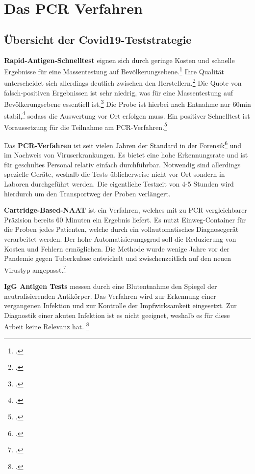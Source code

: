 \chapter{Das PCR Verfahren}
\section{Übersicht der Covid19-Teststrategie}
\textbf{Rapid-Antigen-Schnelltest} eignen sich durch geringe Kosten und schnelle Ergebnisse für eine Massentestung auf Bevölkerungsebene.\footcite{papenburg_adequacy_2022}
Ihre Qualität unterscheidet sich allerdings deutlich zwischen den Herstellern.\footcite{zerforschung_zerforschung_2022}
Die Quote von falsch-positiven Ergebnissen ist sehr niedrig, was für eine Massentestung auf Bevölkerungsebene essentiell ist.\footcite{papenburg_adequacy_2022}
Die Probe ist hierbei nach Entnahme nur 60min stabil,\footcite{weishampel_orasure_2022}
sodass die Auswertung vor Ort erfolgen muss.
Ein positiver Schnelltest ist Voraussetzung für die Teilnahme am PCR-Verfahren.\footcite{land_corona-verordnung_2022}

Das \textbf{PCR-Verfahren} ist seit vielen Jahren der Standard in der Forensik\footcite{wink_pcr_1994}
und im Nachweis von Viruserkrankungen. Es bietet eine hohe Erkennungsrate und ist für geschultes Personal relativ einfach durchführbar. Notwendig sind allerdings spezielle Geräte, weshalb die Tests üblicherweise nicht vor Ort sondern in Laboren durchgeführt werden. Die eigentliche Testzeit von 4-5 Stunden wird hierdurch um den Transportweg der Proben verlängert.

\textbf{Cartridge-Based-NAAT} ist ein Verfahren, welches mit zu PCR vergleichbarer Präzision bereits 60 Minuten ein Ergebnis liefert. Es nutzt Einweg-Container für die Proben jedes Patienten, welche durch ein vollautomatisches Diagnosegerät verarbeitet werden. Der hohe Automatisierungsgrad soll die Reduzierung von Kosten und Fehlern ermöglichen. Die Methode wurde wenige Jahre vor der Pandemie gegen Tuberkulose entwickelt und zwischenzeitlich auf den neuen Virustyp angepasst.\footcite{kendall_antigen-based_2021}

\textbf{IgG Antigen Tests} messen durch eine Blutentnahme den Spiegel der neutralisierenden Antikörper.
Das Verfahren wird zur Erkennung einer vergangenen Infektion und zur Kontrolle der Impfwirksamkeit eingesetzt.
Zur Diagnostik einer akuten Infektion ist es nicht geeignet, weshalb es für diese Arbeit keine Relevanz hat.
\footcite{muller_age-dependent_2021}

